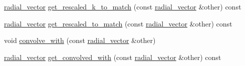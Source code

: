 \begin{DoxyCompactItemize}
\item 
\hyperlink{classIceBRG_1_1Fourier_1_1radial__vector}{radial\+\_\+vector} \hyperlink{classIceBRG_1_1Fourier_1_1radial__vector_a4ff3d327fa3ea0be2d8470ce7b6cd132}{get\+\_\+rescaled\+\_\+k\+\_\+to\+\_\+match} (const \hyperlink{classIceBRG_1_1Fourier_1_1radial__vector}{radial\+\_\+vector} \&other) const 
\item 
\hyperlink{classIceBRG_1_1Fourier_1_1radial__vector}{radial\+\_\+vector} \hyperlink{classIceBRG_1_1Fourier_1_1radial__vector_a0fcd21cef156944f87efa8cbff1c09b5}{get\+\_\+rescaled\+\_\+to\+\_\+match} (const \hyperlink{classIceBRG_1_1Fourier_1_1radial__vector}{radial\+\_\+vector} \&other) const 
\item 
void \hyperlink{classIceBRG_1_1Fourier_1_1radial__vector_a5120ceb165e75753e5f9e52e78bf9f7b}{convolve\+\_\+with} (const \hyperlink{classIceBRG_1_1Fourier_1_1radial__vector}{radial\+\_\+vector} \&other)
\item 
\hyperlink{classIceBRG_1_1Fourier_1_1radial__vector}{radial\+\_\+vector} \hyperlink{classIceBRG_1_1Fourier_1_1radial__vector_aa43ed2d15cc7566b428ed75866ce39e0}{get\+\_\+convolved\+\_\+with} (const \hyperlink{classIceBRG_1_1Fourier_1_1radial__vector}{radial\+\_\+vector} \&other) const 
\end{DoxyCompactItemize}
